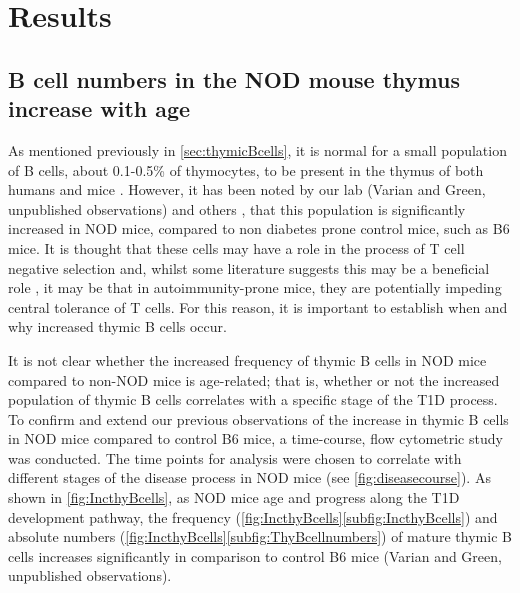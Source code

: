 
\chapter{Results}


\section{B cell numbers in the NOD mouse thymus increase with age}

As mentioned previously in \cref{sec:thymicBcells}, it is normal for a small population of B cells, about 0.1-0.5\% of thymocytes, to be present in the thymus of both humans and mice \citep{Perera2013}.
However, it has been noted by our lab (Varian and Green, unpublished observations) and others \citep{OReilly1994}, that this population is significantly increased in NOD mice, compared to non diabetes prone control mice, such as B6 mice.
It is thought that these cells may have a role in the process of T cell negative selection and, whilst some literature suggests this may be a beneficial role \citep{Frommer2010, Perera2013}, it may be that in autoimmunity-prone mice, they are potentially impeding central tolerance of T cells.
For this reason, it is important to establish when and why increased thymic B cells occur.


It is not clear whether the increased frequency of thymic B cells in NOD mice compared to non-NOD mice is age-related; that is, whether or not the increased population of thymic B cells correlates with a specific stage of the T1D process.
To confirm and extend our previous observations of the increase in thymic B cells in NOD mice compared to control B6 mice, a time-course, flow cytometric study was conducted. %
The time points for analysis were chosen to correlate with different stages of the disease process in NOD mice (see \cref{fig:diseasecourse}).
As shown in \cref{fig:IncthyBcells}, as NOD mice age and progress along the T1D development pathway, the frequency (\cref{fig:IncthyBcells}\ref{subfig:IncthyBcells}) and absolute numbers (\cref{fig:IncthyBcells}\ref{subfig:ThyBcellnumbers}) of mature thymic B cells increases significantly in comparison to control B6 mice (Varian and Green, unpublished observations). 


